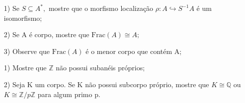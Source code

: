 \documentclass[AlgebraII/algebraII_notes.tex]{subfiles}
\begin{document}
\begin{prop*}[Exercício]
	\begin{itemize}
		\item[1)] Se \(S\subseteq A^{*},\) mostre que o morfismo localização \(\rho :A\hookrightarrow S^{-1}A\) é um isomorfismo;
		\item[2)] Se A é corpo, mostre que \(\mathrm{Frac}(A)\cong{A;}\)
		\item[3)] Observe que \(\mathrm{Frac}(A)\) é o menor corpo que contém A;
	\end{itemize}
\end{prop*}
\begin{example}[Exercício]
	\begin{itemize}
		\item[1)] Mostre que \(\mathbb{Z}\) não possui subanéis próprios;
		\item[2)] Seja K um corpo. Se K não possui subcorpo próprio, mostre que \(K\cong{\mathbb{Q}}\) ou
		      \(K\cong{\mathbb{Z}/p \mathbb{Z}}\) para algum primo p.
	\end{itemize}
\end{example}
\end{document}
